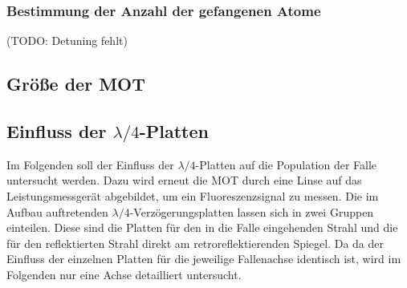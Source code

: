 \documentclass[11pt, a4paper]{article}
\numberwithin{equation}{section}
\newcommand{\korr}[1]{{\color{red}(#1)}}
\begin{document}
\subsubsection{Bestimmung der Anzahl der gefangenen Atome}
\korr{TODO: Detuning fehlt}



\subsection{Größe der MOT}


\subsection{Einfluss der $\lambda / 4$-Platten}
Im Folgenden soll der Einfluss der $\lambda / 4$-Platten auf die Population der Falle untersucht werden.
Dazu wird erneut die MOT durch eine Linse auf das Leistungsmessgerät abgebildet, um ein Fluoreszenzsignal zu messen.
Die im Aufbau auftretenden $\lambda / 4$-Verzögerungsplatten lassen sich in zwei Gruppen einteilen.
Diese sind die Platten für den in die Falle eingehenden Strahl und die für den reflektierten Strahl direkt am retroreflektierenden Spiegel.
Da da der Einfluss der einzelnen Platten für die jeweilige Fallenachse identisch ist, wird im Folgenden nur eine Achse detailliert untersucht.
\end{document}

